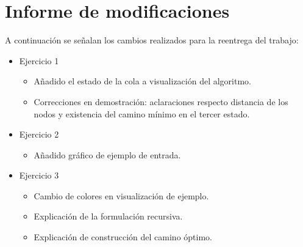 \section*{Informe de modificaciones}

A continuación se señalan los cambios realizados para la reentrega del trabajo:

\begin{itemize}
	\item{
		Ejercicio 1
		\begin{itemize}
			\item{Añadido el estado de la cola a visualización del algoritmo.}
			\item{Correcciones en demostración: aclaraciones respecto distancia
				de los nodos y existencia del camino mínimo en el tercer estado.}
		\end{itemize}
	}
	\item{
		Ejercicio 2
		\begin{itemize}
			\item{Añadido gráfico de ejemplo de entrada.}
		\end{itemize}
	}
	\item{
		Ejercicio 3
		\begin{itemize}
			\item{Cambio de colores en visualización de ejemplo.}
			\item{Explicación de la formulación recursiva.}
			\item{Explicación de construcción del camino óptimo.}
		\end{itemize}
	}
\end{itemize}
